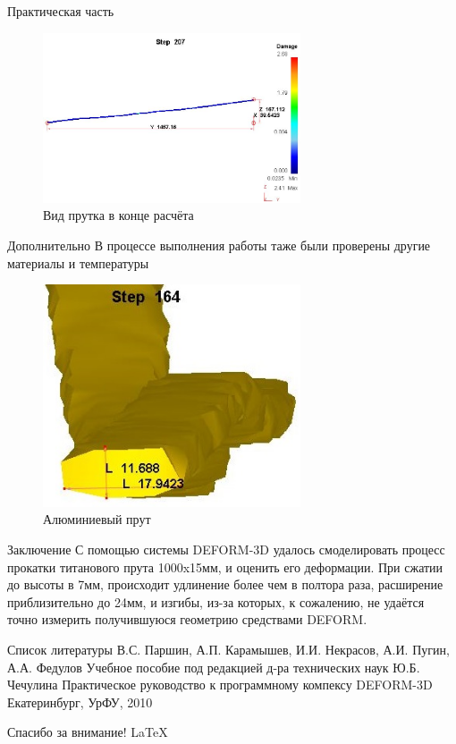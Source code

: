 \documentclass{beamer}
\begin{document}
\begin{frame}{Практическая часть}
\begin{figure}[h]
 \includegraphics[width=3in]{img/step207_3.JPG}
 \footnotesize\caption{Вид прутка в конце расчёта}
\end{figure}
\end{frame}

\begin{frame}{Дополнительно}
В процессе выполнения работы таже были проверены другие материалы и температуры
\begin{figure}[h]
 \includegraphics[width=3in]{img/164_2.JPG}
 \footnotesize\caption{Алюминиевый прут}
\end{figure}
\end{frame}

\begin{frame}{Заключение}
С помощью системы DEFORM-3D удалось смоделировать процесс прокатки титанового прута 1000x15мм, и оценить его деформации.
При сжатии до высоты в 7мм, происходит удлинение более чем в полтора раза, расширение приблизительно до 24мм, и изгибы, из-за которых, к сожалению, не удаётся точно измерить получившуюся геометрию средствами DEFORM.
\end{frame}

\begin{frame}{Список литературы}
В.С. Паршин, А.П. Карамышев, И.И. Некрасов, А.И. Пугин, А.А. Федулов
Учебное пособие под редакцией д-ра технических наук Ю.Б. Чечулина
Практическое руководство к программному компексу DEFORM-3D
Екатеринбург, УрФУ, 2010
\end{frame}

\begin{frame}{Спасибо за внимание!}
\vfill
\centering\LaTeX
\end{frame}
\end{document}
